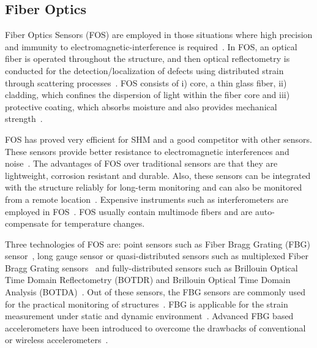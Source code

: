 \documentclass[b5paper, 11pt, titlepage]{book}
\begin{document}
\subsection{Fiber Optics}
Fiber Optics Sensors (FOS) are employed in those situations where high precision and immunity to electromagnetic-interference is required~\cite{li2018fiber}. In FOS, an optical fiber is operated throughout the structure, and then optical reflectometry is conducted for the detection/localization of defects using distributed strain through scattering processes~\cite{warsi2019sensors}. 
FOS consists of i) core, a thin glass fiber, ii) cladding, which confines the dispersion of light within the fiber core and iii) protective coating, which absorbs moisture and also provides mechanical strength~\cite{Torres2011}.

FOS has proved very efficient for SHM and a good competitor with other sensors. These sensors provide better resistance to electromagnetic interferences and noise~\cite{Das2018}. The advantages of FOS over traditional sensors are that they are lightweight, corrosion resistant and durable. Also, these sensors can be integrated with the structure reliably for long-term monitoring and can also be monitored from a remote location~\cite{casas2003fiber, Majumder2008}. Expensive instruments such as interferometers are employed in FOS~\cite{warsi2019sensors}. FOS usually contain multimode fibers and are auto-compensate for temperature changes. 

Three technologies of FOS are: point sensors such as Fiber Bragg Grating (FBG) sensor~\cite{Li2004}, long gauge sensor or quasi-distri\-bu\-ted sensors such as multiplexed Fiber Bragg Grating sensors~\cite{Delepine-Lesoille2006} and fully-distributed sensors such as Brillouin Optical Time Domain Reflectometry (BOTDR) and Brillouin Optical Time Domain Analysis
(BOTDA)~\cite{bourne2009energy}. Out of these sensors, the FBG sensors are commonly used for the practical monitoring of structures~\cite{Majumder2008}. FBG is applicable for the strain measurement under static and dynamic environment~\cite{jawaid2018structural}. Advanced FBG based accelerometers have been introduced to overcome the drawbacks of conventional or wireless accelerometers~\cite{Majumder2008}.
\end{document}
